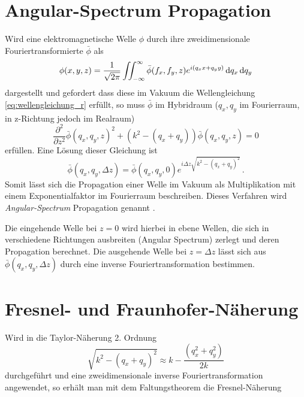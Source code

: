 \section{Angular-Spectrum Propagation}
Wird eine elektromagnetische Welle $\phi$ durch ihre zweidimensionale Fouriertransformierte $\bar{\phi}$ als
\begin{equation}
\phi(x,y,z)=\frac{1}{\sqrt{2\pi}}\iint_{-\infty}^{\infty}\bar{\phi}(f_x,f_y,z)e^{i(q_xx+q_yy)} \dif q_x \dif q_y
\end{equation}dargestellt und gefordert dass diese im Vakuum die Wellengleichung \eqref{eq:wellengleichung_r} erfüllt,
so muss $\bar{\phi}$ im Hybridraum ($q_x,q_y$ im Fourierraum, in z-Richtung jedoch im Realraum)
\begin{equation}
\label{eq:wellengleichung_h}
	\frac{\partial ^2}{\partial z^2}\bar{\phi}(q_x,q_y,z)^2+ \left(k^2-\left(q_x+q_y\right)\right)\bar{\phi}(q_x,q_y,z)=0
\end{equation}
erfüllen. Eine Lösung dieser Gleichung ist
\begin{equation}
\label{eq:angularspectrum}
\bar{\phi}\left(q_x,q_y,\Delta z\right)=\bar{\phi}(q_x,q_y,0)e^{i\Delta z\sqrt{k^2-(q_x+q_y)^2}}\, . 
\end{equation}
Somit lässt sich die Propagation einer Welle im Vakuum als Multiplikation mit einem Exponentialfaktor im Fourierraum beschreiben. Dieses Verfahren wird \textit{Angular-Spectrum} Propagation genannt \cite{goodman2005}. 

Die eingehende Welle bei $z=0$ wird hierbei in ebene Wellen, die sich in verschiedene Richtungen ausbreiten (Angular Spectrum) zerlegt und deren Propagation berechnet. Die ausgehende Welle bei $z=\Delta z$ lässt sich aus $\bar{\phi}\left(q_x,q_y,\Delta z\right)$ durch eine inverse Fouriertransformation bestimmen.


\section{Fresnel- und Fraunhofer-Näherung}
Wird in  die Taylor-Näherung 2. Ordnung
\begin{equation}
	\sqrt{k^2-(q_x+q_y)^2}\approx k-\frac{(q_x^2+q_y^2)}{2k}
\end{equation}
durchgeführt und eine zweidimensionale inverse Fouriertransformation angewendet, so erhält man mit dem Faltungstheorem die Fresnel-Näherung 

